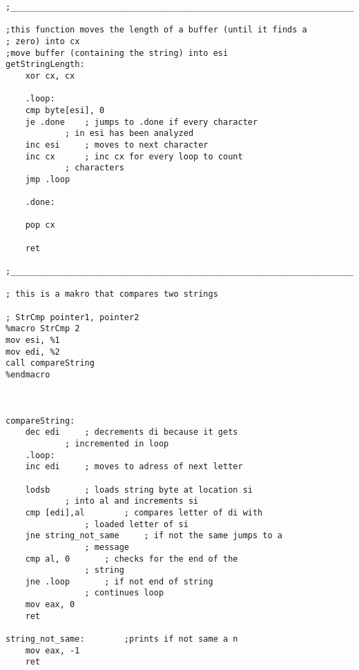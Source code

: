 \begin{lstlisting}[language={[x86masm]Assembler}]
;_________________________________________________________________________

;this function moves the length of a buffer (until it finds a
; zero) into cx
;move buffer (containing the string) into esi
getStringLength:
	xor cx, cx

	.loop:
	cmp byte[esi], 0	
	je .done	; jumps to .done if every character
			; in esi has been analyzed
	inc esi		; moves to next character 
	inc cx		; inc cx for every loop to count
			; characters
	jmp .loop
	
	.done:

	pop cx

	ret

;_________________________________________________________________________

; this is a makro that compares two strings

; StrCmp pointer1, pointer2
%macro StrCmp 2
mov esi, %1
mov edi, %2
call compareString
%endmacro



compareString:
	dec edi		; decrements di because it gets
			; incremented in loop
	.loop:
	inc edi		; moves to adress of next letter
	
	lodsb 		; loads string byte at location si
			; into al and increments si
	cmp [edi],al 		; compares letter of di with
				; loaded letter of si
	jne string_not_same 	; if not the same jumps to a
				; message
	cmp al, 0 		; checks for the end of the
				; string
	jne .loop 		; if not end of string
				; continues loop
	mov eax, 0
	ret

string_not_same: 		;prints if not same a n
	mov eax, -1
	ret

\end{lstlisting}
